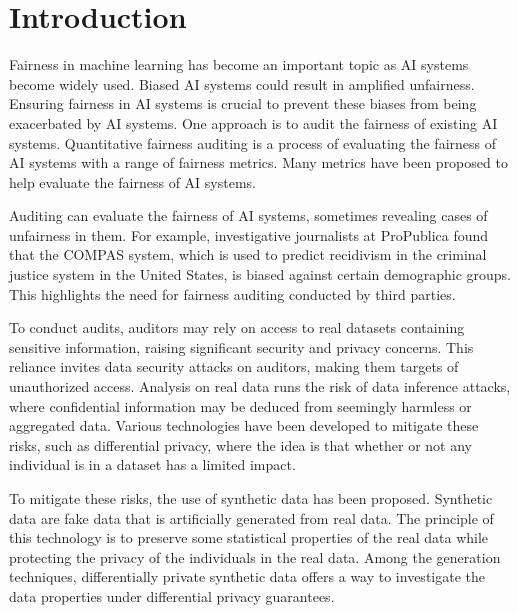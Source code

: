 \documentclass[manuscript,screen,review,anonymous]{acmart}
\begin{document}


\maketitle

\section{Introduction}


Fairness in machine learning has become an important topic as AI systems become widely used. Biased AI systems could result in amplified unfairness. Ensuring fairness in AI systems is crucial to prevent these biases from being exacerbated by AI systems. One approach is to audit the fairness of existing AI systems. Quantitative fairness auditing is a process of evaluating the fairness of AI systems with a range of fairness metrics. Many metrics have been proposed to help evaluate the fairness of AI systems.

Auditing can evaluate the fairness of AI systems, sometimes revealing cases of unfairness in them. For example, investigative journalists at ProPublica found that the COMPAS system, which is used to predict recidivism in the criminal justice system in the United States, is biased against certain demographic groups. This highlights the need for fairness auditing conducted by third parties.


To conduct audits, auditors may rely on access to real datasets containing sensitive information, raising significant security and privacy concerns. This reliance invites data security attacks on auditors, making them targets of unauthorized access. Analysis on real data runs the risk of data inference attacks, where confidential information may be deduced from seemingly harmless or aggregated data. Various technologies have been developed to mitigate these risks, such as differential privacy, where the idea is that whether or not any individual is in a dataset has a limited impact.

To mitigate these risks, the use of synthetic data has been proposed. Synthetic data are fake data that is artificially generated from real data. The principle of this technology is to preserve some statistical properties of the real data while protecting the privacy of the individuals in the real data. Among the generation techniques, differentially private synthetic data offers a way to investigate the data properties under differential privacy guarantees.
\end{document}
